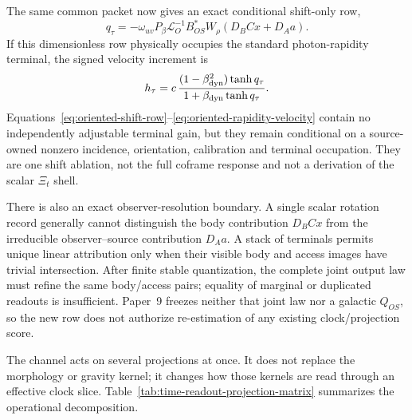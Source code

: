 \documentclass[11pt]{article}
\begin{document}
The same common packet now gives an exact conditional shift-only row,
\begin{equation}
 q_\tau
 =-\omega_{uv}P_\beta\mathcal L_O^{-1}B_{OS}^{*}W_\rho
   (D_BCx+D_Aa).
 \label{eq:oriented-shift-row}
\end{equation}
If this dimensionless row physically occupies the standard photon-rapidity
terminal, the signed velocity increment is
\begin{equation}
 h_\tau
 =c\,\frac{(1-\beta_{\rm dyn}^{2})\tanh q_\tau}{1+\beta_{\rm dyn}\tanh q_\tau}.
 \label{eq:oriented-rapidity-velocity}
\end{equation}
Equations~\eqref{eq:oriented-shift-row}--\eqref{eq:oriented-rapidity-velocity}
contain no independently adjustable terminal gain, but they remain
conditional on a source-owned nonzero incidence, orientation, calibration and
terminal occupation.  They are one shift ablation, not the full coframe
response and not a derivation of the scalar \(\Xi_t\) shell.

There is also an exact observer-resolution boundary.  A single scalar
rotation record generally cannot distinguish the body contribution \(D_BCx\)
from the irreducible observer--source contribution \(D_Aa\).  A stack of
terminals permits unique linear attribution only when their visible body and
access images have trivial intersection.  After finite stable quantization,
the complete joint output law must refine the same body/access pairs; equality
of marginal or duplicated readouts is insufficient.  Paper~9 freezes neither
that joint law nor a galactic \(Q_{OS}\), so the new row does not authorize
re-estimation of any existing clock/projection score.

The channel acts on several projections at once.  It does not replace the
morphology or gravity kernel; it changes how those kernels are read through an
effective clock slice.  Table~\ref{tab:time-readout-projection-matrix}
summarizes the operational decomposition.
\end{document}

